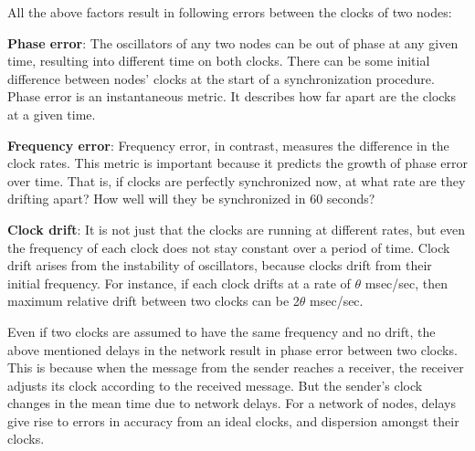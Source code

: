 \documentclass[a4paper,10pt]{report}
\begin{document}
      All the above factors result in following errors between the clocks of two nodes:
\begin{description}
\item \textbf{Phase error}: The oscillators of any two nodes can be out of phase at any given time, resulting into different time on both clocks. There can be some initial difference between nodes' clocks at the start of a synchronization procedure. Phase error is an instantaneous metric. It describes how far apart are the clocks at a given time.
\item \textbf{Frequency error}: Frequency error, in contrast, measures the difference in the clock rates. This metric is important because it predicts the growth of phase error over time. That is, if clocks are perfectly synchronized now, at what rate are they drifting apart? How well will they be synchronized in 60 seconds?
\item \textbf{Clock drift}: It is not just that the clocks are running at different rates, but even the frequency of each clock does not stay constant over a period of time. Clock drift arises from the instability of oscillators, because clocks drift from their initial frequency. For instance, if each clock drifts at a rate of $\theta$ msec/sec, then maximum relative drift between two clocks can be 2$\theta$ msec/sec.
\end{description}
Even if two clocks are assumed to have the same frequency and no drift, the above mentioned delays in the network result in phase
error between two clocks. This is because when the message from the sender reaches a receiver, the receiver adjusts its clock according
to the received message. But the sender's clock changes in the mean time due to network delays. For a network of nodes, delays give rise
to errors in accuracy from an ideal clocks, and dispersion amongst their clocks.
\end{document}
